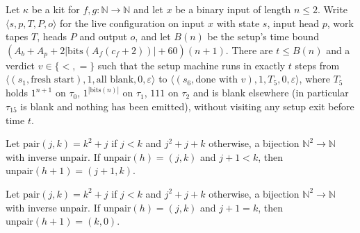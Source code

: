 \begin{theorem}
\label{Turing.NTimeDiag.qy_setup_short}
\leanok
{}
Let $\kappa$ be a kit for $f, g : \mathbb{N} \to \mathbb{N}$ and let $x$ be a binary input of length
$n \le 2$. Write $\langle s, p, T, P, o\rangle$ for the live configuration on input $x$ with state
$s$, input head $p$, work tapes $T$, heads $P$ and output $o$, and let $B(n)$ be the setup's time
bound $(A_b + A_p + 2|\mathrm{bits}(A_f(c_f + 2))| + 60)(n + 1)$. There are $t \le B(n)$ and a
verdict $v \in \{<, =\}$ such that the setup machine runs in exactly $t$ steps from
$\langle (s_1, \text{fresh start}), 1, \text{all blank}, 0, \varepsilon\rangle$ to
$\langle (s_6, \text{done with } v), 1, T_5, 0, \varepsilon\rangle$, where $T_5$ holds $1^{n+1}$ on
$\tau_0$, $1^{|\mathrm{bits}(n)|}$ on $\tau_1$, $111$ on $\tau_2$ and is blank elsewhere (in
particular $\tau_{15}$ is blank and nothing has been emitted), without visiting any setup exit
before time $t$.
\end{theorem}

\begin{theorem}
\label{Turing.NTimeDiag.qy_unpair_succ_lt}
\leanok
{}
Let $\mathrm{pair}(j, k) = k^2 + j$ if $j < k$ and $j^2 + j + k$ otherwise, a bijection
$\mathbb{N}^2 \to \mathbb{N}$ with inverse $\mathrm{unpair}$. If $\mathrm{unpair}(h) = (j, k)$ and
$j + 1 < k$, then $\mathrm{unpair}(h + 1) = (j + 1, k)$.
\end{theorem}

\begin{theorem}
\label{Turing.NTimeDiag.qy_unpair_succ_last}
\leanok
{}
Let $\mathrm{pair}(j, k) = k^2 + j$ if $j < k$ and $j^2 + j + k$ otherwise, a bijection
$\mathbb{N}^2 \to \mathbb{N}$ with inverse $\mathrm{unpair}$. If $\mathrm{unpair}(h) = (j, k)$ and
$j + 1 = k$, then $\mathrm{unpair}(h + 1) = (k, 0)$.
\end{theorem}

